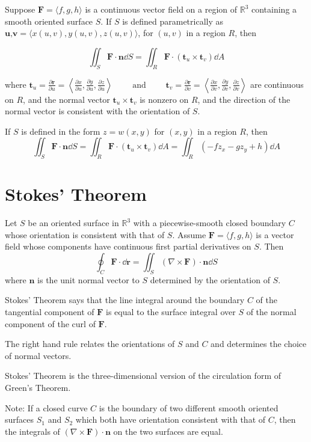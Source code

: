 \documentclass[../calc3.tex]{subfiles}
\begin{document}
\begin{definition}
    Suppose $\textbf{F} = \langle f,g,h\rangle$ is a continuous vector field on a region of $\mathbb{R}^3$ containing a smooth 
    oriented surface $S$. If $S$ is defined parametrically as $\textbf{u,v}=\langle x(u,v), y(u,v), z(u,v)\rangle$, for $(u,v)$ in a region $R$, then 
    
    \[\iint_S \textbf{F}\cdot\textbf{n}\dd S = \iint_R \textbf{F}\cdot(\textbf{t}_u\times\textbf{t}_v)\dd A\]

    where $\textbf{t}_u = \frac{\partial \textbf{r}}{\partial u} = \left\langle \frac{\partial x}{\partial u}, \frac{\partial y}{\partial u}, \frac{\partial z}{\partial u}\right\rangle \qquad \text{ and } \qquad \textbf{t}_v = \frac{\partial\textbf{r}}{\partial v}=\left\langle\frac{\partial x}{\partial v},\frac{\partial y}{\partial v},\frac{\partial z}{\partial v} \right\rangle$
    are continuous on $R$, and the normal vector $\textbf{t}_u\times\textbf{t}_v$ is nonzero on $R$, and the direction of the normal vector is consistent with the orientation of $S$.
\end{definition}

\begin{definition}
    If $S$ is defined in the form $z=w(x,y)$ for $(x,y)$ in a region $R$, then 
    \[\iint_S \textbf{F}\cdot \textbf{n}\dd S = \iint_R \textbf{F}\cdot(\textbf{t}_u\times \textbf{t}_v)\dd A = \iint_R (-fz_x-gz_y+h)\dd A\]

\end{definition}
\section{Stokes' Theorem}
\begin{theorem}
    Let $S$ be an oriented surface in $\mathbb{R}^3$ with a piecewise-smooth closed boundary $C$ whose orientation 
    is consistent with that of $S$. Assume $\textbf{F}=\langle f,g,h \rangle$ is a vector field whose components have continuous first partial 
    derivatives on $S$. Then 
    \[\oint_C \textbf{F}\cdot \dd\textbf{r}=\iint_S (\nabla\times \textbf{F})\cdot\textbf{n}\dd S\]
    where $\textbf{n}$ is the unit normal vector to $S$ determined by the orientation of $S$.

    Stokes' Theorem says that the line integral around the boundary $C$ of the tangential component of $\textbf{F}$ is equal to the surface integral over 
    $S$ of the normal component of the curl of $\textbf{F}$.

    The right hand rule relates the orientations of $S$ and $C$ and determines the choice of normal vectors.

    Stokes' Theorem is the three-dimensional version of the circulation form of Green's Theorem.
\end{theorem}
Note: If a closed curve $C$ is the boundary of two different smooth oriented surfaces $S_1$ and $S_2$ which both have orientation 
consistent with that of $C$, then the integrals of $(\nabla \times \textbf{F})\cdot \textbf{n}$ on the two surfaces are equal.
\end{document}
